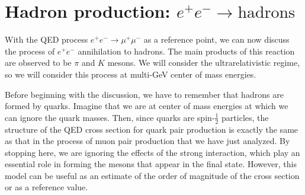 \documentclass[../../main/main.tex]{subfiles}
\begin{document}

\section{Hadron production: \( e^+e^- \rightarrow \text{hadrons} \)}
With the QED process \( e^+e^- \longrightarrow \mu^+\mu^- \) as a reference point, we can now discuss the process of \( e^+e^- \) annihilation to hadrons. The main products of this reaction are observed to be \( \pi \) and \( K \) mesons. We will consider the ultrarelativistic regime, so we will consider this process at multi-GeV center of mass energies.

Before beginning with the discussion, we have to remember that hadrons are formed by quarks. Imagine that we are at center of mass energies at which we can ignore the quark masses. Then, since quarks are spin-\( \frac{1}{2} \) particles, the structure of the QED cross section for quark pair production is exactly the same as that in the process of muon pair production that we have just analyzed. By stopping here, we are ignoring the effects of the strong interaction, which play an essential role in forming the mesons that appear in the final state. However, this model can be useful as an estimate of the order of magnitude of the cross section or as a reference value.
\end{document}

